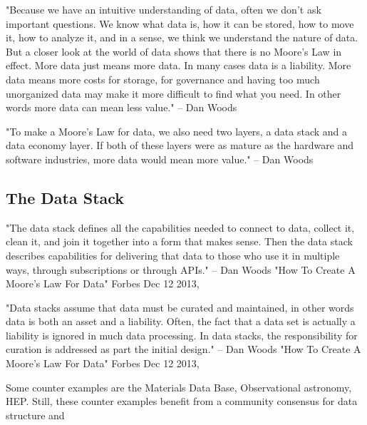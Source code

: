 \documentclass{article}
\begin{document}
"Because we have an intuitive understanding of data, often we don’t ask important questions. We
know what data is, how it can be stored, how to move it, how to analyze it, and in a sense, we
think we understand the nature of data.
But a closer look at the world of data shows that there is no Moore’s Law in effect. More data
just means more data. In many cases data is a liability. More data means more costs for storage,
for governance and having too much unorganized data may make it more difficult to find what
you need. In other words more data can mean less value." -- Dan Woods \cite{Woods2013}

"To make a Moore’s Law for data, we also need two layers, a data stack and a data economy layer. If both of these layers were as mature as the hardware and software industries, more data would
mean more value." -- Dan Woods \cite{Woods2013} %

\subsection{The Data Stack}

"The data stack defines all the capabilities needed to connect to data, collect it, clean it, and join it together into a form that makes sense.
Then the data stack describes capabilities for delivering that data to those who use it in multiple
ways, through subscriptions or through APIs." -- Dan Woods "How To Create A Moore's Law For Data" Forbes Dec 12 2013, \cite{Woods2013} %


"Data stacks assume that data must be curated and maintained, in other words data is both
an asset and a liability. Often, the fact that a data set is actually a liability is ignored in
much data processing. In data stacks, the responsibility for curation is addressed as part
the initial design." -- Dan Woods "How To Create A Moore's Law For Data" Forbes Dec 12 2013, \cite{Woods2013} %


Some counter examples are the Materials Data Base, Observational astronomy, HEP.  Still, these counter examples benefit from a community consensus for data structure and 
\end{document}
